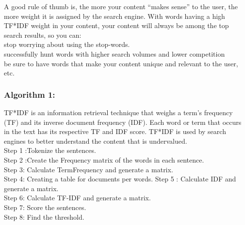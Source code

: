 A good rule of thumb is, the more your content “makes sense” to the user, the more weight it is assigned by the search engine. With words having a high TF*IDF weight in your content, your content will always be among the top search results, so you can:\\

stop worrying about using the stop-words.\\
successfully hunt words with higher search volumes and lower competition\\
be sure to have words that make your content unique and relevant to the user, etc.\\




\subsubsection{Algorithm 1: }
TF*IDF is an information retrieval technique that weighs a term's frequency (TF) and its inverse document frequency (IDF). Each word or term that occurs in the text has its respective TF and IDF score. TF*IDF is used by search engines to better understand the content that is undervalued. \\
Step 1 :Tokenize the sentences. \\
Step 2 :Create the Frequency matrix of the words in each sentence.\\
Step 3: Calculate TermFrequency and generate a matrix. \\
Step 4: Creating a table for documents per words. 
Step 5 : Calculate IDF and generate a matrix.\\
Step 6: Calculate TF-IDF and generate a matrix.\\
Step 7: Score the sentences.\\
Step 8: Find the threshold.\\
